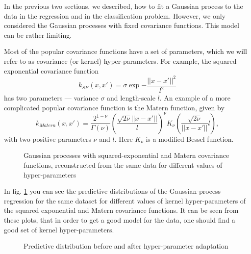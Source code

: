 In the previous two sections, we described, how to fit a Gaussian process to the data in the regression and in the classification problem. However, we only considered the Gaussian processes with fixed covariance functions. This model can be rather limiting.

Most of the popular covariance functions have a set of parameters, which we will refer to as covariance (or kernel) hyper-parameters. For example, the squared exponential covariance function
$$k_{SE}(x, x') = \sigma \exp{ - \frac{||x - x'||^2}{l^2}}$$
has two parameters — variance $\sigma$ and length-scale $l$. An example of a more complicated popular covariance function is the Matern function, given by
$$k_{Matern}(x, x') = \frac{2^{1 - \nu}} {\Gamma(\nu)} \left(\frac{\sqrt{2 \nu}||x - x'||}{l}\right)^{\nu} K_{\nu} \left( \frac{\sqrt{2 \nu}}{||x - x'||}{l}\right),$$ 
with two positive parameters $\nu$ and $l$. Here $K_{\nu}$ is a modified Bessel function.

\begin{figure}[!h]
	\centering

	\subfloat{
		\scalebox{0.5}{
			
		}
	}
	\subfloat{
		\scalebox{0.5}{
			
		}
	}
	\subfloat{
		\scalebox{0.5}{
			
		}
	}

	\subfloat{
		\scalebox{0.5}{
			
		}
	}
	\subfloat{
		\scalebox{0.5}{
			
		}
	}
	\subfloat{
		\scalebox{0.5}{
			
		}
	}
	\label{cov_examples}
	\caption{Gaussian processes with squared-exponential and Matern covariance functions, reconstructed from the same data for different values of hyper-parameters}
\end{figure}

In fig. \ref{cov_examples} you can see the predictive distributions of the Gaussian-process regression for the same dataset for different values of kernel hyper-parameters of the squared exponential and Matern covariance functions. It can be seen from these plots, that in order to get a good model for the data, one should find a good set of kernel hyper-parameters.

\begin{figure}[!h]
	\label{model_adaptation}
	\centering
	\subfloat{
		\scalebox{0.75}{
			
		}
	}
	\subfloat{
		\scalebox{0.75}{
			
		}
	}
	\caption{Predictive distribution before and after hyper-parameter adaptation}
\end{figure}

